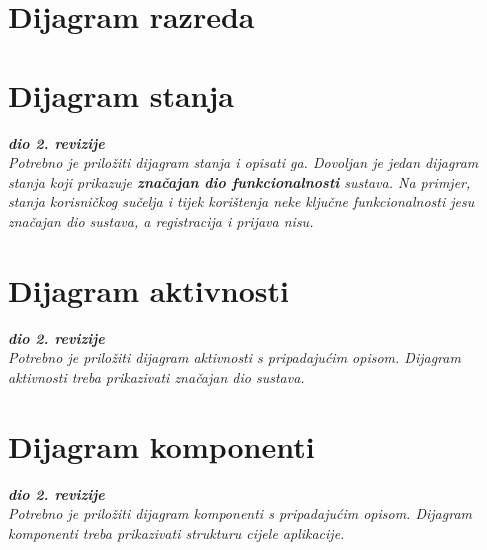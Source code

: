 		\section{Dijagram razreda}
		

			
			
			
			\eject
		
		\section{Dijagram stanja}
			
			
			\textbf{\textit{dio 2. revizije}}\\
			
			\textit{Potrebno je priložiti dijagram stanja i opisati ga. Dovoljan je jedan dijagram stanja koji prikazuje \textbf{značajan dio funkcionalnosti} sustava. Na primjer, stanja korisničkog sučelja i tijek korištenja neke ključne funkcionalnosti jesu značajan dio sustava, a registracija i prijava nisu. }
			
			
			\eject 
		
		\section{Dijagram aktivnosti}
			
			\textbf{\textit{dio 2. revizije}}\\
			
			 \textit{Potrebno je priložiti dijagram aktivnosti s pripadajućim opisom. Dijagram aktivnosti treba prikazivati značajan dio sustava.}
			
			\eject
		\section{Dijagram komponenti}
		
			\textbf{\textit{dio 2. revizije}}\\
		
			 \textit{Potrebno je priložiti dijagram komponenti s pripadajućim opisom. Dijagram komponenti treba prikazivati strukturu cijele aplikacije.}